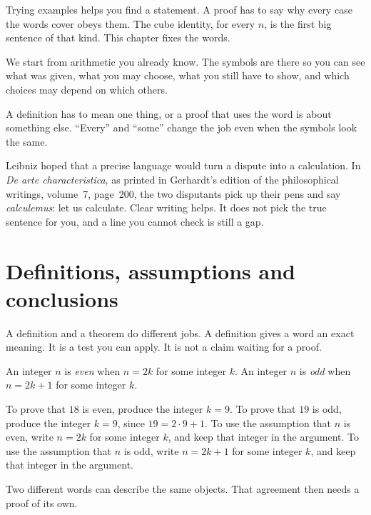 Trying examples helps you find a statement. A proof has to say why every case the words cover obeys them. The cube identity, for every $n$, is the first big sentence of that kind. This chapter fixes the words.

We start from arithmetic you already know. The symbols are there so you can see what was given, what you may choose, what you still have to show, and which choices may depend on which others.

A definition has to mean one thing, or a proof that uses the word is about something else. ``Every'' and ``some'' change the job even when the symbols look the same.

Leibniz hoped that a precise language would turn a dispute into a calculation. In \emph{De arte characteristica}, as printed in Gerhardt's edition of the philosophical writings, volume~7, page~200, the two disputants pick up their pens and say \emph{calculemus}: let us calculate. Clear writing helps. It does not pick the true sentence for you, and a line you cannot check is still a gap.


\section{Definitions, assumptions and conclusions}

A definition and a theorem do different jobs. A definition gives a word an exact meaning. It is a test you can apply. It is not a claim waiting for a proof.

\begin{definitionx}\label{sym:parity}
An integer $n$ is \emph{even} when $n=2k$ for some integer $k$. An integer $n$ is \emph{odd} when $n=2k+1$ for some integer $k$.
\end{definitionx}

To prove that $18$ is even, produce the integer $k=9$. To prove that $19$ is odd, produce the integer $k=9$, since $19=2\cdot 9+1$. To use the assumption that $n$ is even, write $n=2k$ for some integer $k$, and keep that integer in the argument. To use the assumption that $n$ is odd, write $n=2k+1$ for some integer $k$, and keep that integer in the argument.

Two different words can describe the same objects. That agreement then needs a proof of its own.

